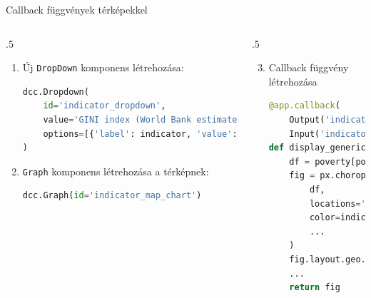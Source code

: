 \documentclass[english, aspectratio=169]{beamer}
\begin{document}
\begin{frame}[fragile]{Callback függvények térképekkel}
	\begin{columns}
		\begin{column}{.5\textwidth}
			\begin{enumerate}
				\item Új \texttt{DropDown} komponens létrehozása:
				\begin{lstlisting}[language=python]
dcc.Dropdown(
	id='indicator_dropdown',
	value='GINI index (World Bank estimate)',
	options=[{'label': indicator, 'value': indicator} for indicator in poverty.columns[3:54]]
)
				\end{lstlisting}
				\item \texttt{Graph} komponens létrehozása a térképnek: 
				\begin{lstlisting}[language=python]
dcc.Graph(id='indicator_map_chart')
				\end{lstlisting}
			\end{enumerate}
		\end{column}
		\begin{column}{.5\textwidth}
			\begin{enumerate}
				\setcounter{enumi}{2}
				\item Callback függvény létrehozása
				\begin{lstlisting}[language=python]
@app.callback(
	Output('indicator_map_chart', 'figure'),
	Input('indicator_dropdown', 'value'))
def display_generic_map_chart(indicator):
	df = poverty[poverty['is_country']]
	fig = px.choropleth(
		df,
		locations='Country Code',
		color=indicator,
		...
	)
	fig.layout.geo.showframe = False
	...
	return fig
				\end{lstlisting}
			\end{enumerate}
		\end{column}
	\end{columns}
\end{frame}
\end{document}
